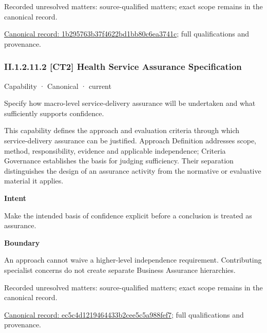{\small Recorded unresolved matters: source-qualified matters; exact scope remains in the canonical record.}\par
{\footnotesize \href{../../../../../../../continuum/strategy/capability/1b295763b37f4622bd1bb80c6ea3741c.md}{Canonical record: 1b295763b37f4622bd1bb80c6ea3741c}; full qualifications and provenance.}\par
\subsubsection*{II.1.2.11.2 [CT2] Health Service Assurance Specification}
\label{navigation:II.1.2.11.2}

\label{element:ec5c4d1219464433b2cee5c5a988fef7}
{\small Capability · Canonical · current}\par

Specify how macro-level service-delivery assurance will be undertaken and what sufficiently supports confidence.



This capability defines the approach and evaluation criteria through which service-delivery assurance can be justified. Approach Definition addresses scope, method, responsibility, evidence and applicable independence; Criteria Governance establishes the basis for judging sufficiency. Their separation distinguishes the design of an assurance activity from the normative or evaluative material it applies.



\textbf{Intent}



Make the intended basis of confidence explicit before a conclusion is treated as assurance.



\textbf{Boundary}



An approach cannot waive a higher-level independence requirement. Contributing specialist concerns do not create separate Business Assurance hierarchies.


{\small Recorded unresolved matters: source-qualified matters; exact scope remains in the canonical record.}\par
{\footnotesize \href{../../../../../../../continuum/strategy/capability/ec5c4d1219464433b2cee5c5a988fef7.md}{Canonical record: ec5c4d1219464433b2cee5c5a988fef7}; full qualifications and provenance.}\par
